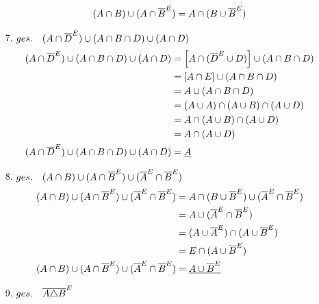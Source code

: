 \begin{itemize}[leftmargin=*]
                        \begin{align*}
                            (A \cap B) \cup (A \cap \overline{B}^E) & = A \cap (B \cup \overline{B}^E) \\
                        \end{align*}
                    \item[7.] $ges.\quad (A \cap \overline{D}^E) \cup (A \cap B \cap D) \cup (A \cap D)$  
                        \begin{align*}
                            (A \cap \overline{D}^E) \cup (A \cap B \cap D) \cup (A \cap D) & = \Big[ A \cap (\overline{D}^E \cup D)\Big] \cup (A \cap B \cap D)\\
                            & = [A \cap E] \cup (A \cap B \cap D) \\
                            & = A \cup (A \cap B \cap D) \\
                            & = (A \cup A) \cap (A \cup B) \cap (A \cup D) \\
                            & = A \cap (A \cup B) \cap (A \cup D) \\
                            & = A \cap (A \cup D) \\
                            (A \cap \overline{D}^E) \cup (A \cap B \cap D) \cup (A \cap D) & = \underline{A} \\
                        \end{align*}
                    \item[8.] $ges.\quad (A \cap B) \cup (A \cap \overline{B}^E) \cup (\overline{A}^E \cap \overline{B}^E)$  
                        \begin{align*}
                            (A \cap B) \cup (A \cap \overline{B}^E) \cup (\overline{A}^E \cap \overline{B}^E) & = A \cap (B \cup \overline{B}^E) \cup (\overline{A}^E \cap \overline{B}^E) \\
                            & = A \cup (\overline{A}^E \cap \overline{B}^E) \\
                            & = (A \cup \overline{A}^E) \cap (A \cup \overline{B}^E) \\
                            & = E \cap (A \cup \overline{B}^E) \\
                            (A \cap B) \cup (A \cap \overline{B}^E) \cup (\overline{A}^E \cap \overline{B}^E) & = \underline{A \cup \overline{B}^E} \\
                        \end{align*}
                    \item[9.] $ges.\quad \overline{A \triangle B}^E$  

\end{itemize}
